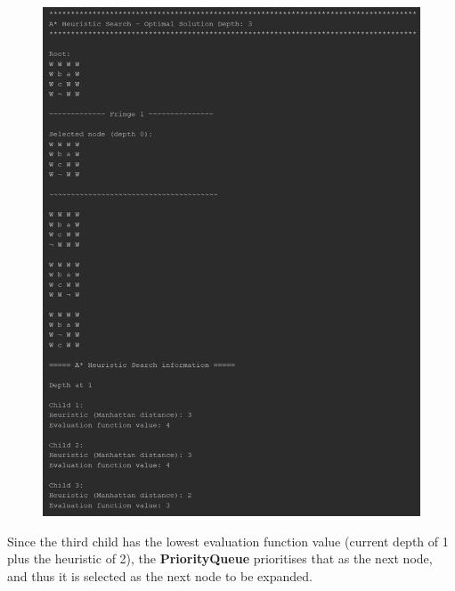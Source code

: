 \documentclass{article}
\begin{document}
	\begin{figure}[h]
		\centering
		\includegraphics[height=0.75\textheight]{AStar-1-1.png}
	\end{figure}

	\newpage
	Since the third child has the lowest evaluation function value (current depth of 1 plus the heuristic of 2), the \textbf{PriorityQueue} prioritises that as the next node, and thus it is selected as the next node to be expanded.
	
\end{document}
